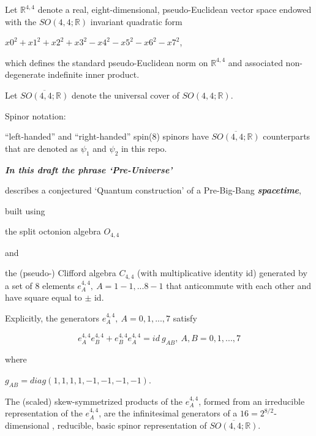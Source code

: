 \documentclass[10pt]{article}
\makeatletter
\newcommand\keepnext{\par\nopagebreak\@nobreaktrue\everypar{\@nobreakfalse\everypar{}}}
\makeatother
\begin{document}
Let $\mathbb{R}^{4,4}$ denote a real, eight-dimensional, pseudo-Euclidean vector space endowed with  the $SO(4,4;\mathbb{R})$ invariant quadratic form


$x0^{2} + x1^{2} + x2^{2} + x3^{2} - x4^{2} - x5^{2} - x6^{2} - x7^{2}$,\keepnext


which defines the standard pseudo-Euclidean norm on $\mathbb{R}^{4,4}$ and associated non-degenerate indefinite inner product.


Let $\overline{SO(4,4;\mathbb{R})}$ denote the universal cover  of $SO(4,4;\mathbb{R})$.


Spinor notation:\keepnext


``left-handed'' and ``right-handed'' spin(8) spinors have $\overline{SO(4,4;\mathbb{R})}$ counterparts that are denoted as $\psi_1$ and $\psi_2$ in this repo.




{\fontsize{18.75}{22.5}\selectfont \textbf{\emph{In this draft the phrase  `Pre-Universe'}}\par}





describes a conjectured `Quantum construction' of a Pre-Big-Bang \textbf{\emph{spacetime}},


built using\keepnext


the split octonion algebra $O_{4,4}$


and\keepnext


the (pseudo-) Clifford algebra $C_{4,4}$ (with multiplicative identity id) generated by a set of 8 elements $e^{4,4}_A, \  A = 1-1,...8-1$ that anticommute with each other and have square equal to $\pm$ id.


Explicitly, the generators $e^{4,4}_A,\  A=0, 1, ..., 7$ satisfy\keepnext


\[e^{4,4}_A e^{4,4}_B + e^{4,4}_B e^{4,4}_A  = id \  g_{A B} , \  A, B = 0, 1, ..., 7\]

where\keepnext


$\displaystyle g_{A B}=diag(1,1,1,1,-1,-1,-1,-1)$.\keepnext


The (scaled) skew-symmetrized products of the $e^{4,4}_A$, formed from an irreducible representation of the $e^{4,4}_A$, are the infinitesimal generators of a $16 = 2^{8/2}$-dimensional ,  reducible, basic spinor representation of $\overline{SO(4,4;\mathbb{R})}$.
\end{document}
